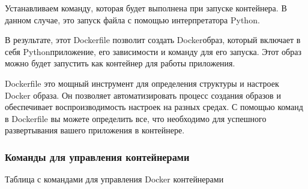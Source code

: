 \documentclass[letterpaper,10pt,russian]{sphinxmanual}
\begin{document}
\sphinxAtStartPar
Устанавливаем команду, которая будет выполнена при запуске контейнера. В данном случае, это запуск файла  с помощью интерпретатора Python.

\sphinxAtStartPar
В результате, этот Dockerfile позволит создать Docker\sphinxhyphen{}образ, который включает в себя Python\sphinxhyphen{}приложение, его зависимости и команду для его запуска. Этот образ можно будет запустить как контейнер для работы приложения.

\sphinxAtStartPar
Dockerfile \textendash{} это мощный инструмент для определения структуры и настроек Docker образа. Он позволяет автоматизировать процесс создания образов и обеспечивает воспроизводимость настроек на разных средах. С помощью команд в Dockerfile вы можете определить все, что необходимо для успешного развертывания вашего приложения в контейнере.


\subsubsection{Команды для управления контейнерами}
\label{\detokenize{educational_materials/docker_base/content:id7}}
\sphinxAtStartPar
Таблица с командами для управления Docker контейнерами
\end{document}
